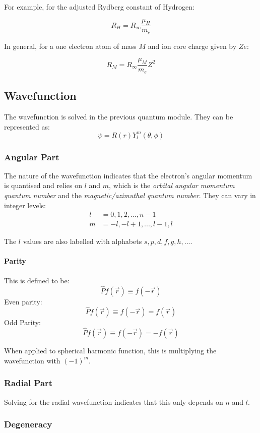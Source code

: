 \documentclass[12pt]{article}
\begin{document}
For example, for the adjusted Rydberg constant of Hydrogen:

\[ R_H = R_\infty \frac{\mu_H}{m_e}\]

In general, for a one electron atom of mass $M$ and ion core charge given by $Ze$:

\[R_M = R_\infty\frac{\mu_M}{m_e}Z^2\]

\subsection{Wavefunction}
The wavefunction is solved in the previous quantum module. They can be represented as:
\[ \psi = R(r)Y^m_l(\theta,\phi)\]

\subsubsection{Angular Part}
The nature of the wavefunction indicates that the electron's angular momentum is quantised and relies on $l$ and $m$, which is the \textit{orbital angular momentum quantum number} and the \textit{magnetic/azimuthal quantum number}. They can vary in integer levels:
\begin{align*}
    l &= 0, 1, 2,..., n - 1\\
    m &= -l, -l+1,...,l-1,l
\end{align*}

The $l$ values are also labelled with alphabets $s,p,d,f,g,h,...$.

\paragraph{Parity}
This is defined to be:
\[\hat{P} f(\vec{r}) \equiv f(-\vec{r})\]
Even parity:
\[\hat{P} f(\vec{r}) \equiv f(-\vec{r}) =  f(\vec{r})\]
Odd Parity:
\[\hat{P} f(\vec{r}) \equiv f(-\vec{r}) =  -f(\vec{r})\]

When applied to spherical harmonic function, this is multiplying the wavefunction with $(-1)^m$.

\subsubsection{Radial Part}

Solving for the radial wavefunction indicates that this only depends on $n$ and $l$.

\subsubsection{Degeneracy}
\end{document}

